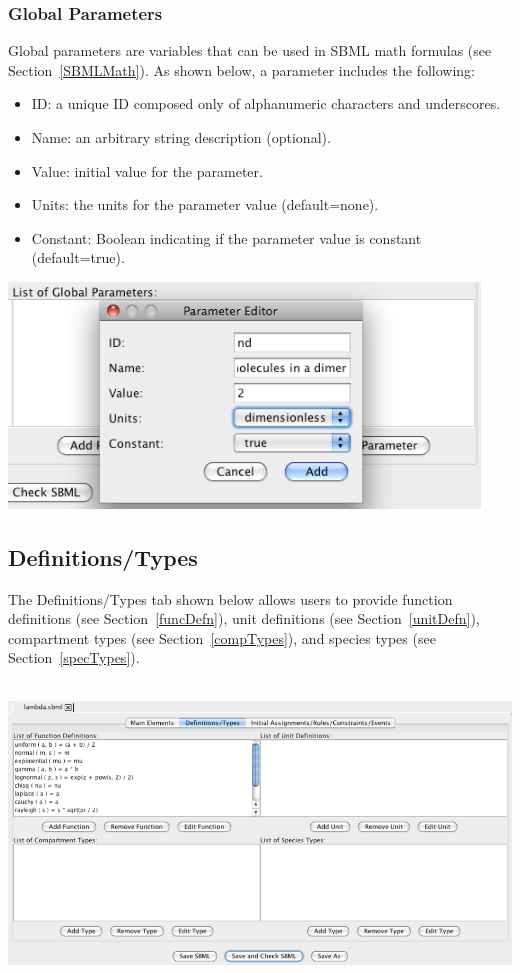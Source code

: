 \documentclass[titlepage,11pt]{article}
\begin{document}
\subsubsection{\label{parameters}Global Parameters}

\noindent
Global parameters are variables that can 
be used in SBML math formulas (see Section~\ref{SBMLMath}).  
As shown below, a parameter includes the following:
\begin{itemize}
\item ID: a unique ID composed only of alphanumeric characters and 
       underscores.
\item Name: an arbitrary string description (optional).
\item Value: initial value for the parameter.
\item Units: the units for the parameter value (default=none).
\item Constant: Boolean indicating if the parameter value 
       is constant (default=true).
\end{itemize}
\begin{center}
\includegraphics[height=60mm]{screenshots/parameter}
\end{center}

\subsection{\label{DefnTypes}Definitions/Types}

\noindent
The Definitions/Types tab shown below allows users to provide 
function definitions (see Section~\ref{funcDefn}), 
unit definitions (see Section~\ref{unitDefn}), 
compartment types (see Section~\ref{compTypes}), and
species types (see Section~\ref{specTypes}).
\begin{center}
\includegraphics[height=80mm]{screenshots/DefnTypes}
\end{center}
\end{document}
